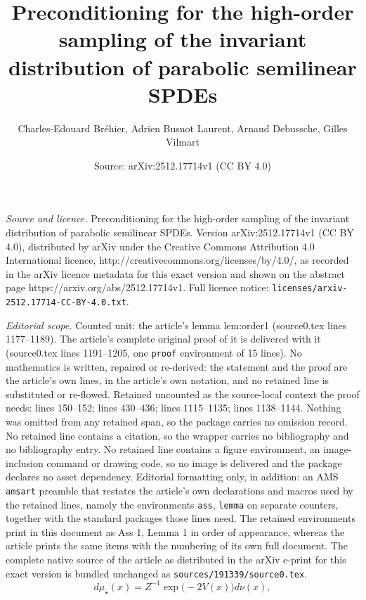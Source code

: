 \documentclass[10pt,a4paper]{amsart}
\title{Preconditioning for the high-order sampling of the invariant distribution of parabolic semilinear SPDEs}
\author{Charles-Edouard Br\'ehier, Adrien Busnot Laurent, Arnaud Debussche, Gilles Vilmart}
\date{Source: arXiv:2512.17714v1 (CC BY 4.0)}
\begin{document}
\maketitle

\noindent\emph{Source and licence.} Preconditioning for the high-order sampling of the invariant distribution of parabolic semilinear SPDEs. Version arXiv:2512.17714v1 (CC BY 4.0), distributed by arXiv under the Creative Commons Attribution 4.0 International licence, http://creativecommons.org/licenses/by/4.0/, as recorded in the arXiv licence metadata for this exact version and shown on the abstract page https://arxiv.org/abs/2512.17714v1. Full licence notice: \texttt{licenses/arxiv-2512.17714-CC-BY-4.0.txt}.\par\smallskip

\noindent\textit{Editorial scope.} Counted unit: the article's lemma lem:order1 (source0.tex lines 1177--1189). The article's complete original proof of it is delivered with it (source0.tex lines 1191--1205, one \texttt{proof} environment of 15 lines). No mathematics is written, repaired or re-derived: the statement and the proof are the article's own lines, in the article's own notation, and no retained line is substituted or re-flowed.  Retained uncounted as the source-local context the proof needs: lines 150--152; lines 430--436; lines 1115--1135; lines 1138--1144.  Nothing was omitted from any retained span, so the package carries no omission record.  No retained line contains a citation, so the wrapper carries no bibliography and no bibliography entry.  No retained line contains a figure environment, an image-inclusion command or drawing code, so no image is delivered and the package declares no asset dependency.  Editorial formatting only, in addition: an AMS \texttt{amsart} preamble that restates the article's own declarations and macros used by the retained lines, namely the environments \texttt{ass}, \texttt{lemma} on separate counters, together with the standard packages those lines need.  The retained environments print in this document as Ass 1, Lemma 1 in order of appearance, whereas the article prints the same items with the numbering of its own full document.  The complete native source of the article as distributed in the arXiv e-print for this exact version is bundled unchanged as \texttt{sources/191339/source0.tex}.
\begin{equation} \label{eq:def_mu_star}
d\mu_\star(x)=Z^{-1}\exp\bigl(-2V(x)\bigr)d\nu(x),
\end{equation}
\end{document}
